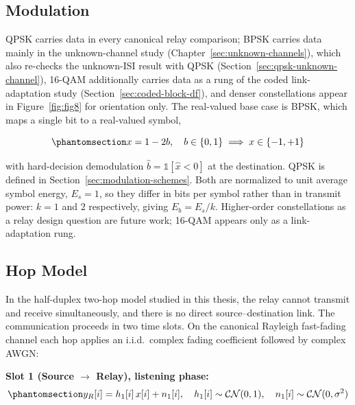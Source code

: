 \subsection{Modulation}\label{sec:modulation}
QPSK carries data in every canonical relay comparison; BPSK carries data mainly in the unknown-channel study (Chapter~\ref{sec:unknown-channels}), which also re-checks the unknown-ISI result with QPSK (Section~\ref{sec:qpsk-unknown-channel}), 16-QAM additionally carries data as a rung of the coded link-adaptation study (Section~\ref{sec:coded-block-df}), and denser constellations appear in Figure~\ref{fig:fig8} for orientation only. The real-valued base case is BPSK, which maps a single bit to a real-valued symbol,

\begin{equation}\protect\phantomsection\label{eq:bpsk-mapping}{x = 1 - 2b, \quad b \in \{0, 1\} \implies x \in \{-1, +1\}}\end{equation}

with hard-decision demodulation \(\hat{b} = \mathbb{1}[\hat{x} < 0]\) at the destination. QPSK is defined in Section~\ref{sec:modulation-schemes}. Both are normalized to unit average symbol energy, \(E_s = 1\), so they differ in bits per symbol rather than in transmit power: \(k = 1\) and \(2\) respectively, giving \(E_b = E_s/k\). Higher-order constellations as a relay design question are future work; 16-QAM appears only as a link-adaptation rung.

\subsection{Hop Model}\label{sec:hop-model}\label{sec:two-hop-relay-model}

In the half-duplex two-hop model studied in this thesis, the relay cannot transmit and receive simultaneously, and there is no direct source--destination link. The communication proceeds in two time slots. On the canonical Rayleigh fast-fading channel each hop applies an i.i.d.\ complex fading coefficient followed by complex AWGN:

\textbf{Slot 1 (Source $\to$ Relay), listening phase:} \begin{equation}\protect\phantomsection\label{eq:rayleigh-hop1}{y_R[i] = h_1[i]\,x[i] + n_1[i], \quad h_1[i] \sim \mathcal{CN}(0, 1), \quad n_1[i] \sim \mathcal{CN}(0, \sigma^2)
}\end{equation}


